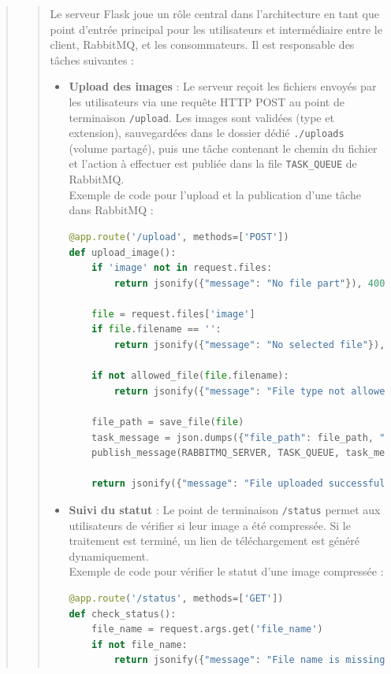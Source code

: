\documentclass[12pt]{article}
\begin{document}
\begin{quote}
\begin{quote}
Le serveur Flask joue un rôle central dans l'architecture en tant que point d'entrée principal pour les utilisateurs et intermédiaire entre le client, RabbitMQ, et les consommateurs. Il est responsable des tâches suivantes : \\

\begin{itemize}
    \item \textbf{Upload des images} : 
    Le serveur reçoit les fichiers envoyés par les utilisateurs via une requête HTTP POST au point de terminaison \texttt{/upload}. Les images sont validées (type et extension), sauvegardées dans le dossier dédié \texttt{./uploads} (volume partagé), puis une tâche contenant le chemin du fichier et l'action à effectuer est publiée dans la file \texttt{TASK\_QUEUE} de RabbitMQ. \\
    
    Exemple de code pour l'upload et la publication d'une tâche dans RabbitMQ : \\
    
\begin{lstlisting}[language=Python]
@app.route('/upload', methods=['POST'])
def upload_image():
    if 'image' not in request.files:
        return jsonify({"message": "No file part"}), 400

    file = request.files['image']
    if file.filename == '':
        return jsonify({"message": "No selected file"}), 400

    if not allowed_file(file.filename):
        return jsonify({"message": "File type not allowed"}), 400

    file_path = save_file(file)
    task_message = json.dumps({"file_path": file_path, "action": "compress"})
    publish_message(RABBITMQ_SERVER, TASK_QUEUE, task_message)

    return jsonify({"message": "File uploaded successfully", "file_path": file_path}), 200
\end{lstlisting}
    \vspace{6mm}
    \item \textbf{Suivi du statut} : 
    Le point de terminaison \texttt{/status} permet aux utilisateurs de vérifier si leur image a été compressée. Si le traitement est terminé, un lien de téléchargement est généré dynamiquement. \\

    Exemple de code pour vérifier le statut d'une image compressée : \\
    
\begin{lstlisting}[language=Python]
@app.route('/status', methods=['GET'])
def check_status():
    file_name = request.args.get('file_name')
    if not file_name:
        return jsonify({"message": "File name is missing"}), 400


\end{lstlisting}
\end{itemize}
\end{quote}
\end{quote}
\end{document}
